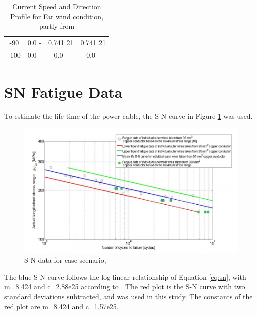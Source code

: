 \begin{table} [H]
\begin{tabular}{ |c|c|c|c|}
 -90 & 0.0 \hspace{0.7cm} - & 0.741 \hspace{0.7cm} 21  & 0.741 \hspace{1.15cm} 21 \\ 
 -100 & 0.0 \hspace{0.7cm} - & 0.0 \hspace{0.7cm} -  & 0.0 \hspace{1.15cm} - \\ 
 \hline
\end{tabular}
\caption{Current Speed and Direction Profile for Far wind condition, partly from \cite{Lifes50+D1.1}}
\label{table:tidcurfar}
\end{table} 

\section{SN Fatigue Data}
To estimate the life time of the power cable, the S-N curve in Figure \ref{fig:snplot} was used. 

\begin{figure}[H]
\centering
\includegraphics[scale=0.6]{figures/SNplot}
\caption[$\; \:$S-N data]{S-N data for case scenario,\cite{s300} }
 \label{fig:snplot}
\end{figure}
\noindent The blue S-N curve follows the log-linear relationship of Equation \ref{eq:sn}, with m=8.424 and c=2.88e25  according to \cite{Nasution2013}. The red plot is the S-N curve with two standard deviations subtracted, and was used in this study. The constants of the red plot are m=8.424 and c=1.57e25. 
